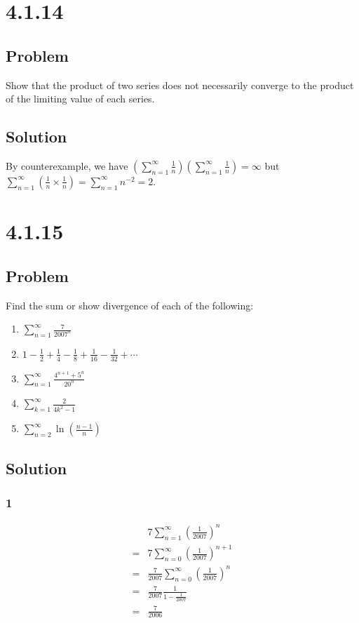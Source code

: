 \documentclass[12pt]{article}
\newcommand{\round}[1]{\left(       #1 \right)      }
\begin{document}
\section*{4.1.14}

\subsection*{Problem}
Show that the product of two series does not necessarily converge to the product of the limiting value of each series.

\subsection*{Solution}
By counterexample, we have $\round{\sum_{n=1}^\infty \frac{1}{n}} \round{\sum_{n=1}^\infty \frac{1}{n}} = \infty$ but $\sum_{n=1}^\infty \round{\frac{1}{n} \times \frac{1}{n}} = \sum_{n=1}^\infty n^{-2} = 2$.



\section*{4.1.15}

\subsection*{Problem}
Find the sum or show divergence of each of the following:
\begin{enumerate}
    \item $\sum_{n = 1}^\infty \frac{7}{2007^n}$
    \item $1 - \frac{1}{2} + \frac{1}{4} - \frac{1}{8} + \frac{1}{16} - \frac{1}{32} + \cdots$
    \item $\sum_{n = 1}^\infty \frac{4^{n + 1} + 5^n}{20^n}$
    \item $\sum_{k = 1}^\infty \frac{2}{4k^2 - 1}$
    \item $\sum_{n=2}^\infty \ln\round{\frac{n-1}{n}}$
\end{enumerate}

\subsection*{Solution}

\subsubsection*{1}
\begin{align*}
     & 7 \sum_{n=1}^\infty \round{\frac{1}{2007}}^n \\
    =& 7 \sum_{n=0}^\infty \round{\frac{1}{2007}}^{n+1} \\
    =& \frac{7}{2007} \sum_{n=0}^\infty \round{\frac{1}{2007}}^n \\
    =& \frac{7}{2007} \frac{1}{1-\frac{1}{2007}} \\
    =& \frac{7}{2006}
\end{align*}
\end{document}
